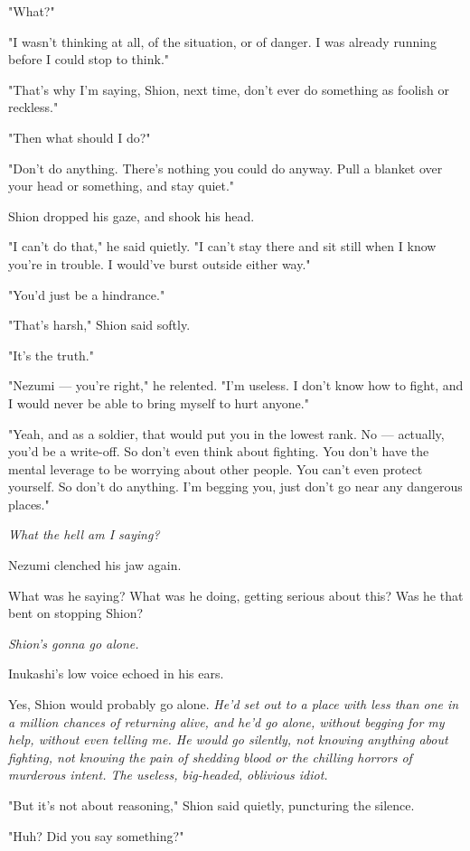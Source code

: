 "What?"

"I wasn't thinking at all, of the situation, or of danger. I was already
running before I could stop to think."

"That's why I'm saying, Shion, next time, don't ever do something as
foolish or reckless."

"Then what should I do?"

"Don't do anything. There's nothing you could do anyway. Pull a blanket
over your head or something, and stay quiet."

Shion dropped his gaze, and shook his head.

"I can't do that," he said quietly. "I can't stay there and sit still
when I know you're in trouble. I would've burst outside either way."

"You'd just be a hindrance."

"That's harsh," Shion said softly.

"It's the truth."

"Nezumi --- you're right," he relented. "I'm useless. I don't know how to
fight, and I would never be able to bring myself to hurt anyone."

"Yeah, and as a soldier, that would put you in the lowest rank. No ---
actually, you'd be a write-off. So don't even think about fighting. You
don't have the mental leverage to be worrying about other people. You
can't even protect yourself. So don't do anything. I'm begging you, just
don't go near any dangerous places."

\emph{What the hell am I saying?}

Nezumi clenched his jaw again.

What was he saying? What was he doing, getting serious about this? Was
he that bent on stopping Shion?

\emph{Shion's gonna go alone.}

Inukashi's low voice echoed in his ears.

Yes, Shion would probably go alone. \emph{He'd set out to a place with less
than one in a million chances of returning alive, and he'd go alone,
without begging for my help, without even telling me. He would go
silently, not knowing anything about fighting, not knowing the pain of
shedding blood or the chilling horrors of murderous intent. The useless,
big-headed, oblivious idiot.}

"But it's not about reasoning," Shion said quietly, puncturing the
silence.

"Huh? Did you say something?"

